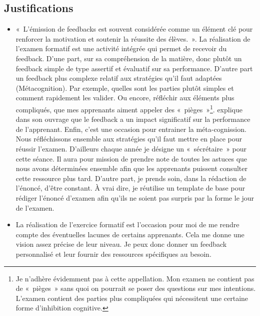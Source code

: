 \subsection{Justifications}
\label{evaluation_des_apprentissages_justifications}
\begin{itemize}
    \item «~L’émission de feedbacks est souvent considérée comme un élément clé pour renforcer la motivation et soutenir la réussite des élèves.~»\cite{georges2011feedbacks}. La réalisation de l'examen formatif est une activité intégrée qui permet de recevoir du feedback. D'une part, sur sa compréhension de la matière, donc plutôt un feedback simple de type assertif et évaluatif\cite{georges2011feedbacks} sur sa performance. D'autre part un feedback plus complexe relatif aux stratégies qu'il faut adaptées (Métacognition). Par exemple, quelles sont les parties plutôt simples et comment rapidement les valider. Ou encore, réfléchir aux éléments plus compliqués, que mes apprenants aiment appeler des «~pièges~»\footnote{Je n'adhère évidemment pas à cette appellation. Mon examen ne contient pas de «~pièges~» sans quoi on pourrait se poser des questions sur mes intentions. L'examen contient des parties plus compliquées qui nécessitent une certaine forme d'inhibition cognitive.}. \citet{hattie2008visible} explique dans son ouvrage que le feedback a un impact significatif sur la performance de l'apprenant. Enfin, c'est une occasion pour entrainer la méta-cognission\cite{leclercq2008modele}. Nous réfléchissons ensemble aux stratégies qu'il faut mettre en place pour réussir l'examen. D'ailleurs chaque année je désigne un «~sécrétaire~» pour cette séance. Il aura pour mission de prendre note de toutes les astuces que nous avons déterminées ensemble afin que les apprenants puissent consulter cette ressource plus tard. D'autre part, je prends soin, dans la rédaction de l'énoncé, d'être constant. À vrai dire, je réutilise un template de base pour rédiger l'énoncé d’examen afin qu’ils ne soient pas surpris par la forme le jour de l'examen.
    \item La réalisation de l'exercice formatif est l'occasion pour moi de me rendre compte des éventuelles lacunes de certains apprenants. Cela me donne une vision assez précise de leur niveau. Je peux donc donner un feedback personnalisé et leur fournir des ressources spécifiques au besoin.
\end{itemize}

